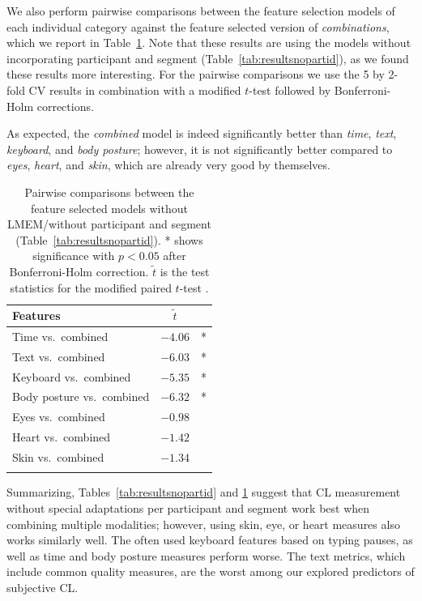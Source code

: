 \documentclass[output=paper]{langsci/langscibook}
\begin{document}
We also perform pairwise comparisons between the feature selection models of each individual category against the feature selected version of \textit{combinations}, which we report in Table~\ref{tab:pairwise}. Note that these results are using the models without incorporating participant and segment (Table~\ref{tab:resultsnopartid}), as we found these results more interesting. For the pairwise comparisons we use the 5 by 2-fold CV results in combination with a modified $t$-test \citep{dietterich1998approximate} followed by Bonferroni-Holm corrections.

As expected, the \textit{combined} model is indeed significantly better than \textit{time}, \textit{text}, \textit{keyboard}, and \textit{body posture}; however, it is not significantly better compared to \textit{eyes}, \textit{heart}, and \textit{skin}, which are already very good by themselves.

\begin{table}
\begin{tabular}{lr@{ }c}
\lsptoprule
Features & \multicolumn{1}{c}{$\tilde{t}$} & \\
\midrule
Time vs.\ combined & $-4.06$ & *\\
Text vs.\ combined & $-6.03$ & *\\
Keyboard vs.\ combined & $-5.35$ & *\\
Body posture vs.\ combined & $-6.32$ & *\\
\midrule
Eyes vs.\ combined & $-0.98$& \\
Heart vs.\ combined & $-1.42$& \\
Skin vs.\ combined & $-1.34$& \\
\lspbottomrule
\end{tabular}
\caption{Pairwise comparisons between the feature selected models without LMEM\slash without participant and segment (Table~\ref{tab:resultsnopartid}). * shows significance with $p<0.05$ after Bonferroni-Holm correction. $\tilde{t}$ is the test statistics for the modified paired $t$-test \citep{dietterich1998approximate}.\label{tab:pairwise}}
\end{table}

Summarizing, Tables~\ref{tab:resultsnopartid} and \ref{tab:pairwise} suggest that CL measurement without special adaptations per participant and segment work best when combining multiple modalities; however, using skin, eye, or heart measures also works similarly well. The often used keyboard features based on typing pauses, as well as time and body posture measures perform worse. The text metrics, which include common quality measures, are the worst among our explored predictors of subjective CL.
\end{document}
